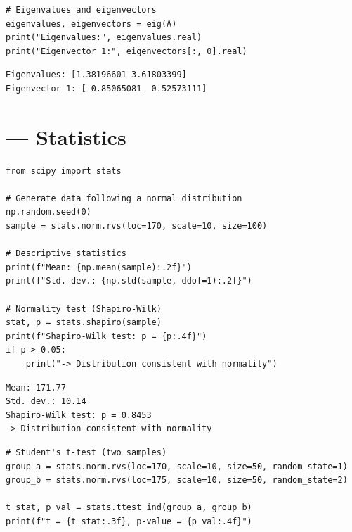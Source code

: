 \begin{codeblock}[title=\textbf{Python}]
\begin{verbatim}
# Eigenvalues and eigenvectors
eigenvalues, eigenvectors = eig(A)
print("Eigenvalues:", eigenvalues.real)
print("Eigenvector 1:", eigenvectors[:, 0].real)
\end{verbatim}
\end{codeblock}

\begin{codeoutput}
\begin{verbatim}
Eigenvalues: [1.38196601 3.61803399]
Eigenvector 1: [-0.85065081  0.52573111]
\end{verbatim}
\end{codeoutput}

\section{ --- Statistics}

\begin{codeblock}[title=\textbf{Python}]
\begin{verbatim}
from scipy import stats

# Generate data following a normal distribution
np.random.seed(0)
sample = stats.norm.rvs(loc=170, scale=10, size=100)

# Descriptive statistics
print(f"Mean: {np.mean(sample):.2f}")
print(f"Std. dev.: {np.std(sample, ddof=1):.2f}")

# Normality test (Shapiro-Wilk)
stat, p = stats.shapiro(sample)
print(f"Shapiro-Wilk test: p = {p:.4f}")
if p > 0.05:
    print("-> Distribution consistent with normality")
\end{verbatim}
\end{codeblock}

\begin{codeoutput}
\begin{verbatim}
Mean: 171.77
Std. dev.: 10.14
Shapiro-Wilk test: p = 0.8453
-> Distribution consistent with normality
\end{verbatim}
\end{codeoutput}

\begin{codeblock}[title=\textbf{Python}]
\begin{verbatim}
# Student's t-test (two samples)
group_a = stats.norm.rvs(loc=170, scale=10, size=50, random_state=1)
group_b = stats.norm.rvs(loc=175, scale=10, size=50, random_state=2)

t_stat, p_val = stats.ttest_ind(group_a, group_b)
print(f"t = {t_stat:.3f}, p-value = {p_val:.4f}")
\end{verbatim}
\end{codeblock}

